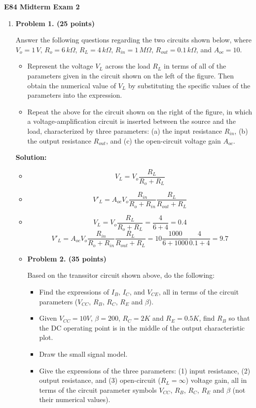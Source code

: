 \usepackage{html}

\begin{center}
{\Large \bf E84 Midterm Exam 2}
\end{center}


\begin{enumerate}

\item {\bf Problem 1. (25 points)} 

  Answer the following questions regarding the two circuits shown 
  below, where $V_o=1\,V$, $R_o=6\,k\Omega$, $R_L=4\,k\Omega$, 
  $R_{in}=1\,M\Omega$, $R_{out}=0.1\,k\Omega$, and $A_{oc}=10$.
  \begin{itemize}
  \item Represent the voltage $V_L$ across the load $R_L$ in terms of 
    all of the parameters given in the circuit shown on the left of the 
    figure. Then obtain the numerical value of $V_L$ by substituting the 
    specific values of the parameters into the expression.
  \item Repeat the above for the circuit shown on the right of the 
    figure, in which a voltage-amplification circuit is inserted between 
    the source and the load, characterized by three parameters: (a) the
    input resistance $R_{in}$, (b) the output resistance $R_{out}$, and 
    (c) the open-circuit voltage gain $A_{oc}$. 
  \end{itemize}

{\bf Solution:}
\begin{itemize}
\item \[ V_L=V_o \frac{R_L}{R_o+R_L} \]
\item \[ V'_L=A_{oc}V_o \frac{R_{in}}{R_o+R_{in}}\frac{R_L}{R_{out}+R_L} \]
\item \[ V_L=V_o \frac{R_L}{R_o+R_L}=\frac{4}{6+4}=0.4  \]
 \[ V'_L=A_{oc}V_o \frac{R_{in}}{R_o+R_{in}}\frac{R_L}{R_{out}+R_L} 
 =10\frac{1000}{6+1000}\frac{4}{0.1+4}=9.7 \]


\item {\bf Problem 2. (35 points)}


Based on the transsitor circuit shown above, do the following:
\begin{itemize}
\item Find the expressions of $I_B$, $I_C$, and $V_{CE}$, all in terms 
  of the circuit parameters ($V_{CC}$, $R_B$, $R_C$, $R_E$ and $\beta$).
\item Given $V_{CC}=10V$, $\beta=200$, $R_C=2K$ and $R_E=0.5K$, find
  $R_B$ so that the DC operating point is in the middle of the output
  characteristic plot.
\item Draw the small signal model.
\item Give the expressions of the three parameters: (1) input resistance,
  (2) output resistance, and (3) open-circuit ($R_L=\infty$) voltage gain,
  all in terms of the circuit parameter symbols $V_{CC}$, $R_B$, $R_C$, 
  $R_E$ and $\beta$ (not their numerical values).
\end{itemize}


\end{itemize}
\end{enumerate}
